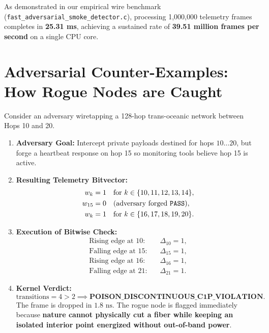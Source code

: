 \documentclass[11pt,a4paper]{article}
\theoremstyle{definition}
\begin{document}
As demonstrated in our empirical wire benchmark (\texttt{fast\_adversarial\_smoke\_detector.c}), processing 1,000,000 telemetry frames completes in \textbf{25.31 ms}, achieving a sustained rate of \textbf{39.51 million frames per second} on a single CPU core.

\section{Adversarial Counter-Examples: How Rogue Nodes are Caught}

\begin{tcolorbox}[colback=red!5!white,colframe=red!75!black,title=\textbf{Case Study: Selective Wiretapping and False Invariant Proof}]
Consider an adversary wiretapping a 128-hop trans-oceanic network between Hops 10 and 20. 
\begin{enumerate}
    \item \textbf{Adversary Goal:} Intercept private payloads destined for hops $10 \dots 20$, but forge a heartbeat response on hop 15 so monitoring tools believe hop 15 is active.
    \item \textbf{Resulting Telemetry Bitvector:}
    \begin{align*}
        w_k &= 1 \quad \text{for } k \in \{10, 11, 12, 13, 14\}, \\
        w_{15} &= 0 \quad (\text{adversary forged \texttt{PASS}}), \\
        w_k &= 1 \quad \text{for } k \in \{16, 17, 18, 19, 20\}.
    \end{align*}
    \item \textbf{Execution of Bitwise Check:}
    \begin{align*}
        \text{Rising edge at 10:} & \quad \Delta_{10} = 1, \\
        \text{Falling edge at 15:} & \quad \Delta_{15} = 1, \\
        \text{Rising edge at 16:} & \quad \Delta_{16} = 1, \\
        \text{Falling edge at 21:} & \quad \Delta_{21} = 1.
    \end{align*}
    \item \textbf{Kernel Verdict:}
    \begin{equation}
        \text{transitions} = 4 > 2 \implies \mathbf{POISON\_DISCONTINUOUS\_C1P\_VIOLATION}.
    \end{equation}
    The frame is dropped in $1.8\text{ ns}$. The rogue node is flagged immediately because \textbf{nature cannot physically cut a fiber while keeping an isolated interior point energized without out-of-band power}.
\end{enumerate}
\end{tcolorbox}
\end{document}
